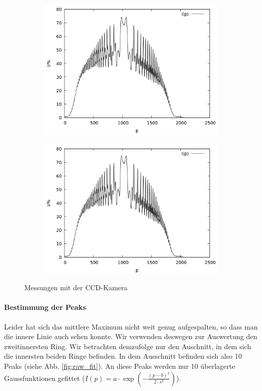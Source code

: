 \begin{figure}
\begin{subfigure}{0.45\textwidth}
\includegraphics[width=\textwidth]{data/zeeman/out_8_4_raw.png}
\end{subfigure}
\begin{subfigure}{0.45\textwidth}
\includegraphics[width=\textwidth]{data/zeeman/out_8_5_raw.png}
\end{subfigure}
\caption{Messungen mit der CCD-Kamera}
\label{fig:raw}
\end{figure}

\paragraph{Bestimmung der Peaks}
Leider hat sich das mittlere Maximum nicht weit genug aufgespalten, so dass man die innere Linie auch sehen konnte. Wir verwenden deswegen zur Auswertung den zweitinnersten Ring. Wir betrachten demzufolge nur den Auschnitt, in dem sich die innersten beiden Ringe befinden. In dem Ausschnitt befinden sich also 10 Peaks (siehe Abb. \ref{fig:raw_fit}). An diese Peaks werden nur 10 überlagerte Gaussfunktionen gefittet ($I(p) = a\cdot \exp\left(-\frac{(p-b)^2}{2\cdot s^2}\right)$).


